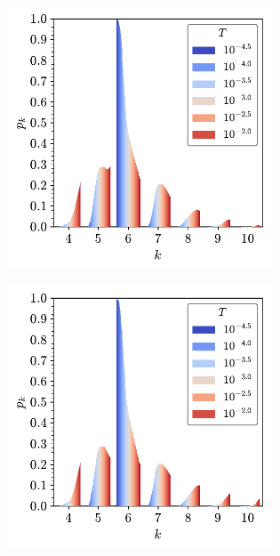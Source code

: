 \begin{figure}[tb]
	\centering
     
     \begin{subfigure}[b]{0.48\textwidth}
         \centering
         \includegraphics[width=0.87\textwidth]{./figures/ph/tr_pk_ph.pdf}
         \caption{}
         \label{fig:trpkph}
     \end{subfigure}
     \hfill
     \begin{subfigure}[b]{0.48\textwidth}
         \centering
         \includegraphics[width=0.87\textwidth]{./figures/ph/tr_pk_true.pdf}
         \caption{}
         \label{fig:trpkph}
     \end{subfigure}
     \vspace{0.5cm}
     

\end{figure}
